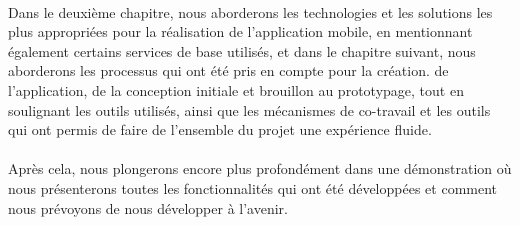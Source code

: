 \paragraph*{}
Dans le deuxième chapitre, nous aborderons les technologies et les solutions les plus appropriées pour la réalisation de l’application mobile, en mentionnant également certains services de base utilisés, et dans le chapitre suivant, nous aborderons les processus qui ont été pris en compte pour la création. de l’application, de la conception initiale et brouillon au prototypage, tout en soulignant les outils utilisés, ainsi que les mécanismes de co-travail et les outils qui ont permis de faire de l’ensemble du projet une expérience fluide.
\paragraph*{}
Après cela, nous plongerons encore plus profondément dans une démonstration où nous présenterons toutes les fonctionnalités qui ont été développées et comment nous prévoyons de nous développer à l’avenir.

